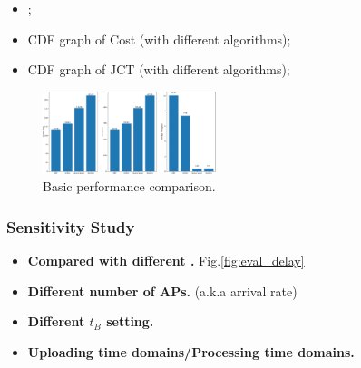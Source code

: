     \begin{itemize}
        \item {};
        \item CDF graph of Cost (with different algorithms);
        \item CDF graph of JCT (with different algorithms);
    \end{itemize}

    \begin{figure}[h]
        \centering
        \includegraphics[width=0.45\textwidth]{images/bar_graph.pdf}
        \caption{Basic performance comparison.}
        \label{fig:bar_plot}
    \end{figure}

    \subsubsection{Sensitivity Study}
    \begin{itemize}
        \item \textbf{Compared with different \brlatency.} Fig.\ref{fig:eval_delay}
        \item \textbf{Different number of APs.} (a.k.a arrival rate)
        \item \textbf{Different $t_B$ setting.}
        \item \textbf{Uploading time domains/Processing time domains.}
    \end{itemize}

